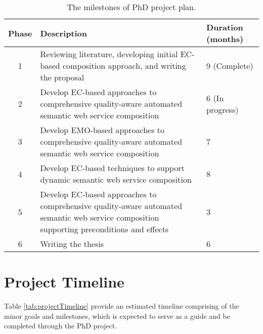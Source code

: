 \begin{table}
\small
\centering
\caption{The milestones of PhD project plan.}
\vspace{0.2cm}
\begin{tabular}{|c|p{100mm}|l|}
\hline
Phase & Description & Duration (months) \\ \hline
1 & Reviewing literature, developing initial EC-based composition approach, and writing the proposal & 9 (Complete)  \\
2 & Develop EC-based approaches to comprehensive quality-aware automated semantic web service composition & 6 (In progress) \\
3 & Develop EMO-based approaches to comprehensive quality-aware automated semantic web service composition & 7 \\
4 & Develop EC-based techniques to support dynamic semantic web service composition & 8 \\
5 & Develop EC-based approaches to comprehensive quality-aware automated semantic web service composition supporting preconditions and effects & 3 \\
6 & Writing the thesis & 6 \\ \hline
\end{tabular}
\label{tab:projectOverview}
\end{table}

\section{Project Timeline}

Table \ref{tab:projectTimeline} provide an estimated timeline comprising of the minor goals and milestones, which is expected to serve as a guide and be completed through the PhD project.

